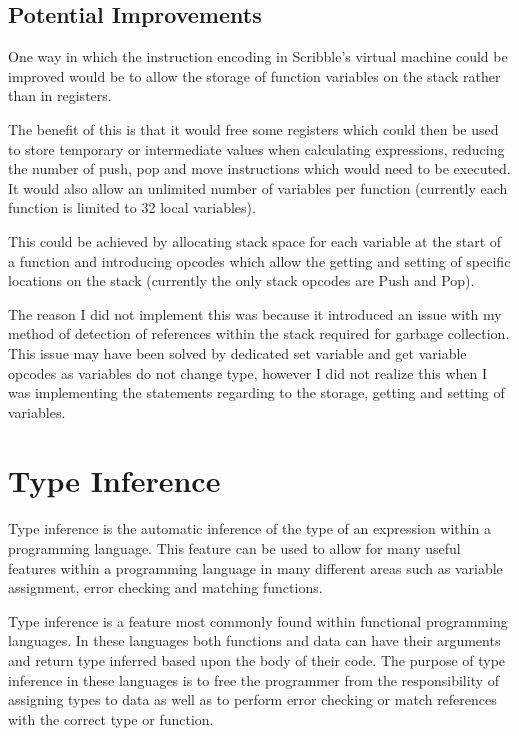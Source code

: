 \documentclass[]{final_report}
\begin{document}
\section{Potential Improvements}

One way in which the instruction encoding in Scribble's virtual machine could be improved would be to allow the storage of function variables on the stack rather than in registers.

The benefit of this is that it would free some registers which could then be used to store temporary or intermediate values when calculating expressions, reducing the number of push, pop and move instructions which would need to be executed. It would also allow an unlimited number of variables per function (currently each function is limited to 32 local variables).

This could be achieved by allocating stack space for each variable at the start of a function and introducing opcodes which allow the getting and setting of specific locations on the stack (currently the only stack opcodes are Push and Pop).

The reason I did not implement this was because it introduced an issue with my method of detection of references within the stack required for garbage collection. This issue may have been solved by dedicated set variable and get variable opcodes as variables do not change type, however I did not realize this when I was implementing the statements regarding to the storage, getting and setting of variables.

\chapter{Type Inference}

Type inference is the automatic inference of the type of an expression within a programming language. This feature can be used to allow for many useful features within a programming language in many different areas such as variable assignment, error checking and matching functions.

Type inference is a feature most commonly found within functional programming languages. In these languages both functions and data can have their arguments and return type inferred based upon the body of their code. The purpose of type inference in these languages is to free the programmer from the responsibility of assigning types to data as well as to perform error checking or match references with the correct type or function.
\end{document}

